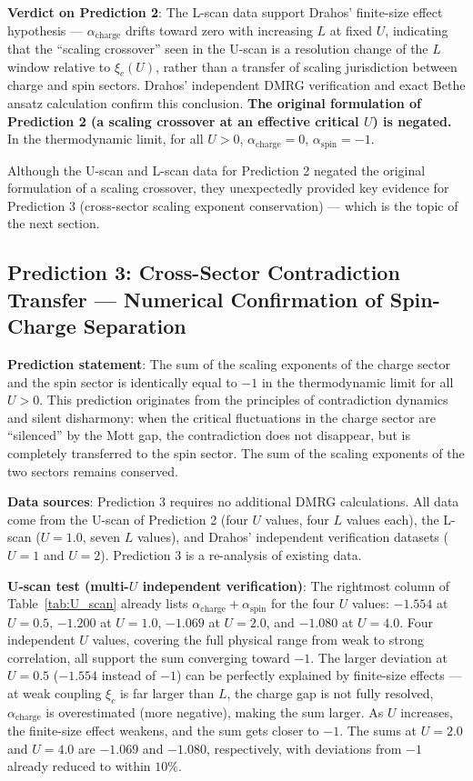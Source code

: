 \documentclass[prb,reprint,twocolumn,superscriptaddress]{revtex4-2}
\begin{document}
\textbf{Verdict on Prediction 2}: The L-scan data support Drahos' finite-size effect hypothesis --- $\alpha_{\mathrm{charge}}$ drifts toward zero with increasing $L$ at fixed $U$, indicating that the ``scaling crossover'' seen in the U-scan is a resolution change of the $L$ window relative to $\xi_c(U)$, rather than a transfer of scaling jurisdiction between charge and spin sectors. Drahos' independent DMRG verification and exact Bethe ansatz calculation confirm this conclusion. \textbf{The original formulation of Prediction 2 (a scaling crossover at an effective critical $U$) is negated.} In the thermodynamic limit, for all $U > 0$, $\alpha_{\mathrm{charge}} = 0$, $\alpha_{\mathrm{spin}} = -1$.

Although the U-scan and L-scan data for Prediction 2 negated the original formulation of a scaling crossover, they unexpectedly provided key evidence for Prediction 3 (cross-sector scaling exponent conservation) --- which is the topic of the next section.

\subsection{Prediction 3: Cross-Sector Contradiction Transfer --- Numerical Confirmation of Spin-Charge Separation}

\textbf{Prediction statement}: The sum of the scaling exponents of the charge sector and the spin sector is identically equal to $-1$ in the thermodynamic limit for all $U > 0$. This prediction originates from the principles of contradiction dynamics and silent disharmony: when the critical fluctuations in the charge sector are ``silenced'' by the Mott gap, the contradiction does not disappear, but is completely transferred to the spin sector. The sum of the scaling exponents of the two sectors remains conserved.

\textbf{Data sources}: Prediction 3 requires no additional DMRG calculations. All data come from the U-scan of Prediction 2 (four $U$ values, four $L$ values each), the L-scan ($U = 1.0$, seven $L$ values), and Drahos' independent verification datasets ($U=1$ and $U=2$). Prediction 3 is a re-analysis of existing data.

\textbf{U-scan test (multi-$U$ independent verification)}: The rightmost column of Table~\ref{tab:U_scan} already lists $\alpha_{\mathrm{charge}} + \alpha_{\mathrm{spin}}$ for the four $U$ values: $-1.554$ at $U = 0.5$, $-1.200$ at $U = 1.0$, $-1.069$ at $U = 2.0$, and $-1.080$ at $U = 4.0$. Four independent $U$ values, covering the full physical range from weak to strong correlation, all support the sum converging toward $-1$. The larger deviation at $U = 0.5$ ($-1.554$ instead of $-1$) can be perfectly explained by finite-size effects --- at weak coupling $\xi_c$ is far larger than $L$, the charge gap is not fully resolved, $\alpha_{\mathrm{charge}}$ is overestimated (more negative), making the sum larger. As $U$ increases, the finite-size effect weakens, and the sum gets closer to $-1$. The sums at $U = 2.0$ and $U = 4.0$ are $-1.069$ and $-1.080$, respectively, with deviations from $-1$ already reduced to within $10\%$.
\end{document}
